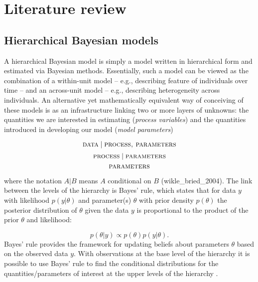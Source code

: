 
\chapter{Literature review}
\label{lit_review}

\section{Hierarchical Bayesian models}

A hierarchical Bayesian model is simply a model written in hierarchical form and estimated via Bayesian methods. Essentially, such a model can be viewed as the combination of a within-unit model -- e.g., describing  feature of individuals over time -- and an across-unit model -- e.g., describing heterogeneity across individuals.  An alternative yet mathematically equivalent way of conceiving of these models is as an infrastructure linking two or more layers of unknowns: the quantities we are interested in estimating ({\it process variables}) and  the quantities introduced in developing our model ({\it model parameters})

{\singlespacing
$$ \textsc{data} \mid \textsc{process, parameters}$$
$$\textsc{process} \mid \textsc{parameters}$$
$$\textsc{parameters}$$ 
}

\noindent where the notation $A | B$ means $A$ conditional on $B$ (wikle\_bried\_2004). The link between the levels of the hierarchy is Bayes' rule, which states that for data $y$ with likelihood $p(y | \theta)$ and parameter(s) $\theta$ with prior density $p(\theta)$ the posterior distribution of $\theta$ given the data $y$ is proportional to the product of the prior $\theta$ and likelihood: 

{\singlespacing
 $$p(\theta | y ) \propto p(\theta) p(y | \theta). $$
}
%
\noindent Bayes' rule provides the framework for updating beliefs about parameters $\theta$ based on the observed data $y$.  With observations at the base level of the hierarchy it is possible to use Bayes' rule to find the conditional distributions for the quantities/parameters of interest at the upper levels of the hierarchy . 









